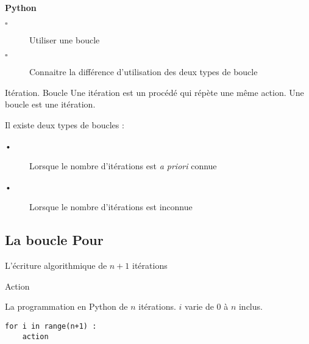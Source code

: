 \begin{titre}

\end{titre}


\begin{CpsCol}
\textbf{Python}
\begin{description}
\item[$\square$] Utiliser une boucle
\item[$\square$] Connaitre la différence d'utilisation des deux types de boucle
\end{description}
\end{CpsCol}

\begin{PC}

\end{PC}


\begin{DefT}{Itération. Boucle}
Une itération est un procédé qui répète une même action. Une boucle est une itération. 
\end{DefT}

\begin{Rq}
Il existe deux types de boucles :
\begin{description}
\item[•] Lorsque le nombre d'itérations est \textit{a priori} connue
\item[•] Lorsque le nombre d'itérations est inconnue
\end{description}
\end{Rq}

\subsection*{La boucle Pour}

\begin{Syn}
\begin{minipage}[t]{0.49\linewidth}
L'écriture algorithmique  de $n+1$ itérations
\begin{algobox}
\DebutPour
\Ligne Action
\FinPour
\end{algobox}

\end{minipage}
\hfill\vrule\hfill
\begin{minipage}[t]{0.49\linewidth}
La programmation en Python de $n$ itérations. $i$ varie de 0 à $n$ inclus.
\begin{lstlisting}
for i in range(n+1) :
	action
\end{lstlisting}
\end{minipage}
\end{Syn}


